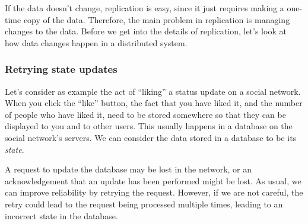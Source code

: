 If the data doesn't change, replication is easy, since it just requires making a one-time copy of the data.
Therefore, the main problem in replication is managing changes to the data.
Before we get into the details of replication, let's look at how data changes happen in a distributed system.

\begin{frame}
    \label{s:retry-increment}
    \frametitle{Retrying state updates}
    \begin{center}
    \end{center}%
\end{frame}
\label{l:retry-increment}

Let's consider as example the act of ``liking'' a status update on a social network.
When you click the ``like'' button, the fact that you have liked it, and the number of people who have liked it, need to be stored somewhere so that they can be displayed to you and to other users.
This usually happens in a database on the social network's servers.
We can consider the data stored in a database to be its \emph{state}.

A request to update the database may be lost in the network, or an acknowledgement that an update has been performed might be lost.
As usual, we can improve reliability by retrying the request.
However, if we are not careful, the retry could lead to the request being processed multiple times, leading to an incorrect state in the database.

